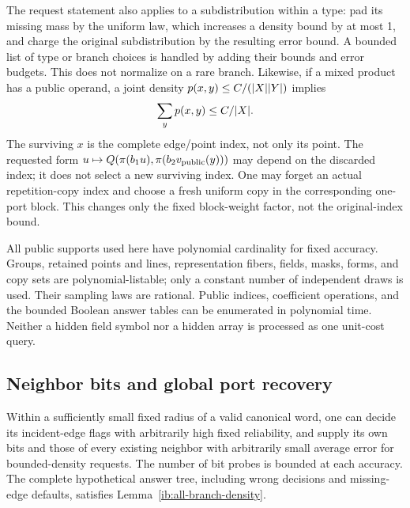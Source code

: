 The request statement also applies to a subdistribution within a
type: pad its missing mass by the uniform law, which increases a
density bound by at most 1, and charge the original subdistribution
by the resulting error bound.  A bounded list of type or branch
choices is handled by adding their bounds and error budgets.
This does not normalize on a rare branch.  Likewise, if a mixed
product has a public operand, a joint density
\(p(x,y)\le C/(\lvert X\rvert\lvert Y\rvert)\) implies
\begin{equation}
 \sum_y p(x,y)\le C/\lvert X\rvert.
 \label{ib:public-marginal}
\end{equation}
The surviving \(x\) is the complete edge/point index, not only
its point.  The requested form
\(u\mapsto Q(\pi(b_1u),\pi(b_2v_{\rm public}(y)))\) may depend
on the discarded index; it does not select a new surviving index.
One may forget an actual repetition-copy index and choose a fresh
uniform copy in the corresponding one-port block.  This changes
only the fixed block-weight factor, not the original-index bound.

All public supports used here have polynomial cardinality for fixed
accuracy.  Groups, retained points and lines, representation fibers,
fields, masks, forms, and copy sets are polynomial-listable; only a
constant number of independent draws is used.  Their sampling laws
are rational.  Public indices, coefficient operations, and the
bounded Boolean answer tables can be enumerated in polynomial time.
Neither a hidden field symbol nor a hidden array is processed as one
unit-cost query.

\subsection{Neighbor bits and global port recovery}
\label{ib:neighbors-recovery}

\begin{proposition}
\label{ib:neighbors}
Within a sufficiently small fixed radius of a valid canonical word,
one can decide its incident-edge flags with arbitrarily high fixed
reliability, and supply its own bits and those of every existing
neighbor with arbitrarily small average error for bounded-density
requests.  The number of bit probes is bounded at each accuracy.
The complete hypothetical answer tree, including wrong decisions
and missing-edge defaults, satisfies
Lemma~\ref{ib:all-branch-density}.
\end{proposition}

